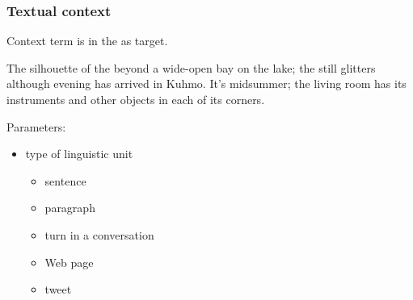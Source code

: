 \documentclass[t]{beamer} %
\begin{document}
\begin{frame}
  \frametitle{Textual context}
  
  \begin{center}
    Context term is in the  as target.
  \end{center}

  {\color{secondary}The silhouette of the} 
  {\color{secondary}beyond a wide-open bay on the lake; the}
   {\color{secondary}still glitters although evening has
    arrived in Kuhmo.} It's midsummer; the living room has its
  instruments and other objects in each of its corners.
  
  \gap
  Parameters:
  \begin{itemize}
  \item type of linguistic unit
    \begin{itemize}
    \item sentence
    \item paragraph
    \item turn in a conversation
    \item Web page
    \item tweet
    \end{itemize}
  \end{itemize}
\end{frame}
\end{document}
